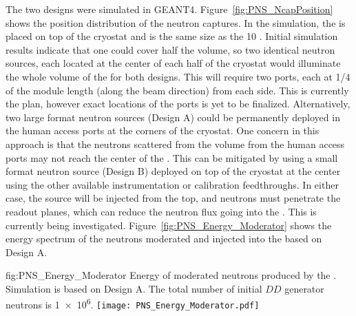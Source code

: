The two designs were simulated in GEANT4. Figure~\ref{fig:PNS_NcapPosition} shows the position distribution of the neutron captures. In the simulation, the  is placed on top of the cryostat and is the same size as the  \SI{10}{\kton} .  Initial simulation results indicate that one  could cover half the  volume, so two identical neutron sources, each located at the center of each half of the cryostat
would illuminate the whole  volume of the   for both designs. This will require two ports, each at 1/4 of the module length (along the beam direction) from each side. This is currently the plan, however exact locations of the ports is yet to be finalized.
Alternatively, two large format neutron sources (Design A) could be permanently deployed in the human access ports at the corners of the cryostat. One concern in this approach is that the neutrons scattered from the  volume from the human access ports may not reach the center of the . This can be mitigated by using a small format neutron source (Design B) deployed on top of the cryostat at the center using the other available instrumentation or calibration feedthroughs. %
In either case, the source will be injected from the top, and neutrons must penetrate the  readout planes, which can reduce the neutron flux going into the . %
This is currently being investigated.
Figure~\ref{fig:PNS_Energy_Moderator} shows the energy spectrum of the neutrons moderated and injected into the  based on Design A.



\begin{dunefigure}{fig:PNS_Energy_Moderator}
{Energy of moderated neutrons produced by the . Simulation is based on Design A. The total number of initial $DD$ generator neutrons is \num{1e6}. }
\texttt{[image: PNS\_Energy\_Moderator.pdf]}
\end{dunefigure}

